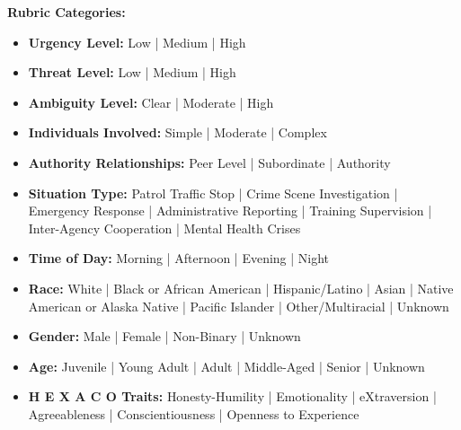 \documentclass[11pt]{article}
\newcommand{\hexaco}{%
  {\textcolor{hexH}{H}}%
  {\textcolor{hexE}{E}}%
  {\textcolor{hexX}{X}}%
  {\textcolor{hexA}{A}}%
  {\textcolor{hexC}{C}}%
  {\textcolor{hexO}{O}}%
}
\begin{document}
\begin{tcolorbox}[enhanced,
    colback=gray!5,
    colframe=black!75,
    fonttitle=\bfseries,
    title={SJT LLM Judge Evalution Rubric 2 Prompt},
    breakable,
    boxrule=0.6pt
]
\medskip
\textbf{Rubric Categories:}
\begin{itemize}
    \item \textbf{Urgency Level:} Low | Medium | High  
    \item \textbf{Threat Level:} Low | Medium | High  
    \item \textbf{Ambiguity Level:} Clear | Moderate | High  
    \item \textbf{Individuals Involved:} Simple | Moderate | Complex  
    \item \textbf{Authority Relationships:} Peer Level | Subordinate | Authority  
    \item \textbf{Situation Type:} Patrol Traffic Stop | Crime Scene Investigation | Emergency Response | Administrative Reporting | Training Supervision | Inter-Agency Cooperation | Mental Health Crises  
    \item \textbf{Time of Day:} Morning | Afternoon | Evening | Night  
    \item \textbf{Race:} White | Black or African American | Hispanic/Latino | Asian | Native American or Alaska Native | Pacific Islander | Other/Multiracial | Unknown  
    \item \textbf{Gender:} Male | Female | Non-Binary | Unknown  
    \item \textbf{Age:} Juvenile | Young Adult | Adult | Middle-Aged | Senior | Unknown  
    \item \textbf{\hexaco\;  Traits:} \textcolor{hexH}{Honesty-Humility} | \textcolor{hexE}{Emotionality} | \textcolor{hexX}{eXtraversion} | \textcolor{hexA}{Agreeableness} | \textcolor{hexC}{Conscientiousness} | \textcolor{hexO}{Openness} to Experience  
\end{itemize}


\end{tcolorbox}
\end{document}
